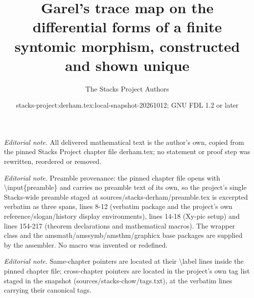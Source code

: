 \documentclass[10pt,a4paper]{amsart}
\title{Garel's trace map on the differential forms of a finite syntomic morphism, constructed and shown unique}
\author{The Stacks Project Authors}
\date{stacks-project:derham.tex:local-snapshot-20261012; GNU FDL 1.2 or later}
\theoremstyle{plain}
\theoremstyle{definition}
\theoremstyle{remark}
\numberwithin{equation}{subsection}
\begin{document}
\maketitle
\noindent\textit{Editorial note.} All delivered mathematical text is the author's own, copied from the pinned Stacks Project chapter file derham.tex; no statement or proof step was rewritten, reordered or removed.\par\medskip
\noindent\textit{Editorial note.} Preamble provenance: the pinned chapter file opens with \textbackslash{}input\{preamble\} and carries no preamble text of its own, so the project's single Stacks-wide preamble staged at sources/stacks-derham/preamble.tex is excerpted verbatim as three spans, lines 8-12 (verbatim package and the project's own reference/slogan/history display environments), lines 14-18 (Xy-pic setup) and lines 154-217 (theorem declarations and mathematical macros). The wrapper class and the amsmath/amssymb/amsthm/graphicx base packages are supplied by the assembler. No macro was invented or redefined.\par\medskip
\noindent\textit{Editorial note.} Same-chapter pointers are located at their \textbackslash{}label lines inside the pinned chapter file; cross-chapter pointers are located in the project's own tag list staged in the snapshot (sources/stacks-chow/tags.txt), at the verbatim lines carrying their canonical tags.\par\medskip
\end{document}
